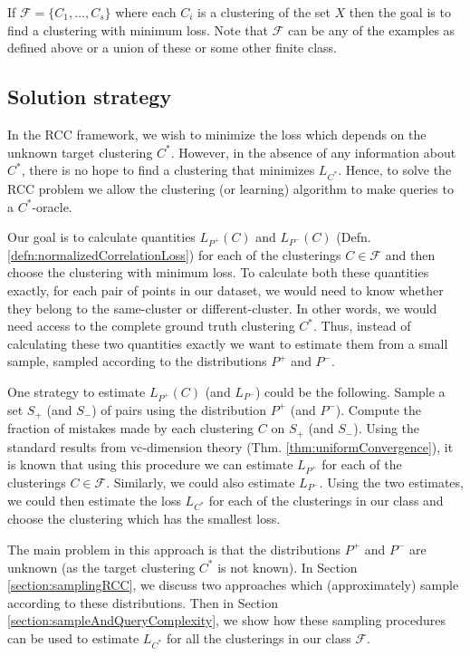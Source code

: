 \documentclass[12pt]{article}
\newcommand{\mc}{\mathcal}
\begin{document}
If $\mc F = \{C_1, \ldots, C_s\}$ where each $C_i$ is a clustering of the set $X$ then the goal is to find a clustering with minimum loss. Note that $\mc F$ can be any of the examples as defined above or a union of these or some other finite class. 
    
\subsection{Solution strategy}
In the RCC framework, we wish to minimize the loss which depends on the unknown target clustering $C^*$. However, in the absence of any information about $C^*$, there is no hope to find a clustering that minimizes $L_{C^*}$. Hence, to solve the RCC problem we allow the clustering (or learning) algorithm to make queries to a $C^*$-oracle. 
  
Our goal is to calculate quantities $L_{P^+}(C)$ and $L_{P^-}(C)$ (Defn. \ref{defn:normalizedCorrelationLoss}) for each of the clusterings $C \in \mc F$ and then choose the clustering with minimum loss. To calculate both these quantities exactly, for each pair of points in our dataset, we would need to know whether they belong to the same-cluster or different-cluster. In other words, we would need access to the complete ground truth clustering $C^*$. Thus, instead of calculating these two quantities exactly we want to estimate them from a small sample, sampled according to the distributions $P^+$ and $P^-$.  

One strategy to estimate $L_{P^+}(C)$ (and $L_{P^-}$) could be the following. Sample a set $S_+$ (and $S_-$) of pairs using the distribution $P^+$ (and $P^-$). Compute the fraction of mistakes made by each clustering $C$ on $S_+$ (and $S_-$). Using the standard results from vc-dimension theory (Thm. \ref{thm:uniformConvergence}), it is known that using this procedure we can estimate $L_{P^+}$ for each of the clusterings $C \in \mc F$. Similarly, we could also estimate $L_{P^-}$. Using the two estimates, we could then estimate the loss $L_{C^*}$ for each of the clusterings in our class and choose the clustering which has the smallest loss. 

The main problem in this approach is that the distributions $P^+$ and $P^-$ are unknown (as the target clustering $C^*$ is not known). In Section \ref{section:samplingRCC}, we discuss two approaches which (approximately) sample according to these distributions. Then in Section \ref{section:sampleAndQueryComplexity}, we show how these sampling procedures can be used to estimate $L_{C^*}$ for all the clusterings in our class $\mc F$.
\end{document}
